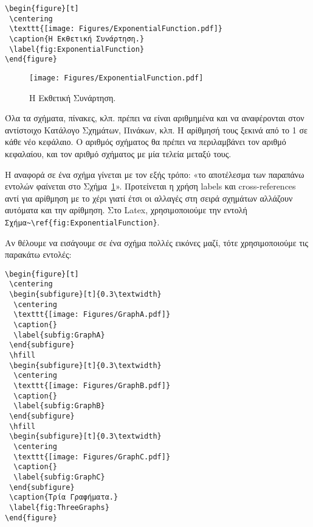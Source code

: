 \begin{verbatim}
\begin{figure}[t]
 \centering
 \texttt{[image: Figures/ExponentialFunction.pdf]}
 \caption{Η Εκθετική Συνάρτηση.}
 \label{fig:ExponentialFunction}
\end{figure}
\end{verbatim}

\begin{figure}[t]
	\centering
	\texttt{[image: Figures/ExponentialFunction.pdf]}
	\caption{Η Εκθετική Συνάρτηση.}
	\label{fig:ExponentialFunction}
\end{figure}

Όλα τα σχήματα, πίνακες, κλπ. πρέπει να είναι αριθμημένα και να αναφέρονται στον αντίστοιχο Κατάλογο Σχημάτων, Πινάκων, κλπ.
Η αρίθμησή τους ξεκινά από το 1 σε κάθε νέο κεφάλαιο.
Ο αριθμός σχήματος θα πρέπει να περιλαμβάνει τον αριθμό κεφαλαίου, και τον αριθμό σχήματος με μία τελεία μεταξύ τους.

Η αναφορά σε ένα σχήμα γίνεται με τον εξής τρόπο: 
«το αποτέλεσμα των παραπάνω εντολών φαίνεται στο 
Σχήμα~\ref{fig:ExponentialFunction}».
Προτείνεται η χρήση labels και cross-references αντί για αρίθμηση με το χέρι γιατί έτσι οι αλλαγές στη σειρά σχημάτων αλλάζουν αυτόματα και την αρίθμηση.
Στο Latex, χρησιμοποιούμε την εντολή 
\verb|Σχήμα~\ref{fig:ExponentialFunction}|.

Αν θέλουμε να εισάγουμε σε ένα σχήμα πολλές εικόνες μαζί, τότε χρησιμοποιούμε 
τις παρακάτω εντολές:

\begin{verbatim}
\begin{figure}[t]
 \centering
 \begin{subfigure}[t]{0.3\textwidth}
  \centering
  \texttt{[image: Figures/GraphA.pdf]}
  \caption{}
  \label{subfig:GraphA}
 \end{subfigure}
 \hfill
 \begin{subfigure}[t]{0.3\textwidth}
  \centering
  \texttt{[image: Figures/GraphB.pdf]}
  \caption{}
  \label{subfig:GraphB}
 \end{subfigure}
 \hfill
 \begin{subfigure}[t]{0.3\textwidth}
  \centering
  \texttt{[image: Figures/GraphC.pdf]}
  \caption{}
  \label{subfig:GraphC}
 \end{subfigure}
 \caption{Τρία Γραφήματα.}
 \label{fig:ThreeGraphs}
\end{figure}
\end{verbatim}

